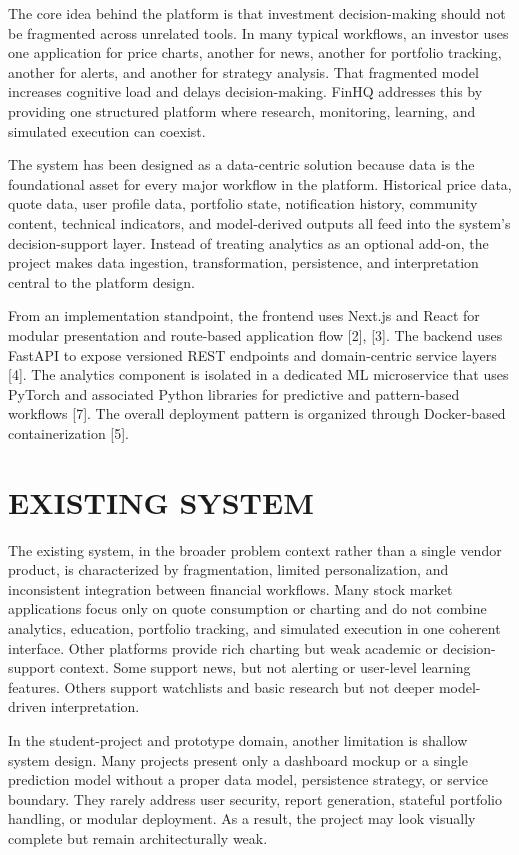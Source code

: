 \documentclass[12pt,a4paper]{report}
\newcommand{\projectshort}{FinHQ}
\begin{document}
The core idea behind the platform is that investment decision-making should not be fragmented across unrelated tools. In many typical workflows, an investor uses one application for price charts, another for news, another for portfolio tracking, another for alerts, and another for strategy analysis. That fragmented model increases cognitive load and delays decision-making. \projectshort{} addresses this by providing one structured platform where research, monitoring, learning, and simulated execution can coexist.

The system has been designed as a data-centric solution because data is the foundational asset for every major workflow in the platform. Historical price data, quote data, user profile data, portfolio state, notification history, community content, technical indicators, and model-derived outputs all feed into the system's decision-support layer. Instead of treating analytics as an optional add-on, the project makes data ingestion, transformation, persistence, and interpretation central to the platform design.

From an implementation standpoint, the frontend uses Next.js and React for modular presentation and route-based application flow [2], [3]. The backend uses FastAPI to expose versioned REST endpoints and domain-centric service layers [4]. The analytics component is isolated in a dedicated ML microservice that uses PyTorch and associated Python libraries for predictive and pattern-based workflows [7]. The overall deployment pattern is organized through Docker-based containerization [5].

\section{EXISTING SYSTEM}
The existing system, in the broader problem context rather than a single vendor product, is characterized by fragmentation, limited personalization, and inconsistent integration between financial workflows. Many stock market applications focus only on quote consumption or charting and do not combine analytics, education, portfolio tracking, and simulated execution in one coherent interface. Other platforms provide rich charting but weak academic or decision-support context. Some support news, but not alerting or user-level learning features. Others support watchlists and basic research but not deeper model-driven interpretation.

In the student-project and prototype domain, another limitation is shallow system design. Many projects present only a dashboard mockup or a single prediction model without a proper data model, persistence strategy, or service boundary. They rarely address user security, report generation, stateful portfolio handling, or modular deployment. As a result, the project may look visually complete but remain architecturally weak.
\end{document}
